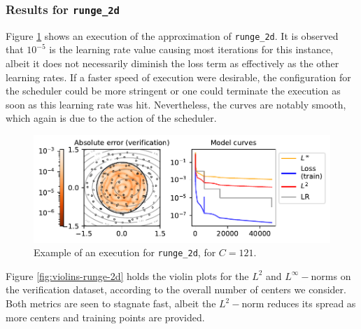 \documentclass[12pt]{report} %
\begin{document}
\subsubsection*{Results for \texttt{runge\_2d}}

Figure \ref{fig:example-execution-runge-2d} shows an execution of the approximation of \texttt{runge\_2d}. It is observed that $10^{-5}$ is the learning rate value causing most iterations for this instance, albeit it does not necessarily diminish the loss term as effectively as the other learning rates. If a faster speed of execution were desirable, the configuration for the scheduler could be more stringent or one could terminate the execution as soon as this learning rate was hit. Nevertheless, the curves are notably smooth, which again is due to the action of the scheduler.

\begin{figure}
  \includegraphics[width=\textwidth]{imagenes/experiments/2d/statistical_2d_full_scheduler_interpolation/runge_2d/runge_2d-TR22-C121-Kgaussian_kernel-Sh2.5635-rrrepetishon-E47252.pdf}
  \caption{Example of an execution for \texttt{runge\_2d}, for $C=121$.}
  \label{fig:example-execution-runge-2d}
\end{figure}

Figure \ref{fig:violins-runge-2d} holds the violin plots for the $L^2$ and $L^\infty-$norms on the verification dataset, according to the overall number of centers we consider. Both metrics are seen to stagnate fast, albeit the $L^2-$norm reduces its spread as more centers and training points are provided.
\end{document}
